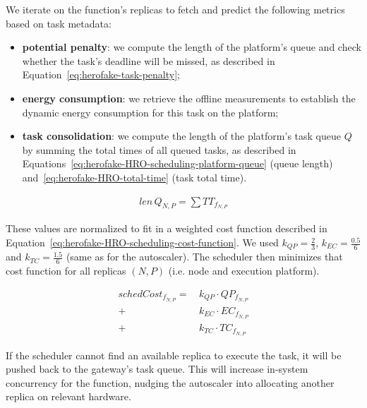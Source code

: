 We iterate on the function's replicas to fetch and predict the following metrics based on task metadata:

\begin{itemize}
    \item \textbf{potential penalty}: we compute the length of the platform's queue and check whether the task's deadline will be missed, as described in Equation~\ref{eq:herofake-task-penalty};
    \item \textbf{energy consumption}: we retrieve the offline measurements to establish the dynamic energy consumption for this task on the platform;
    \item \textbf{task consolidation}: we compute the length of the platform's task queue $Q$ by summing the total times of all queued tasks, as described in Equations~\ref{eq:herofake-HRO-scheduling-platform-queue} (queue length) and~\ref{eq:herofake-HRO-total-time} (task total time). 
\end{itemize}

\begin{equation}
\begin{split}
    len \, Q_{N, P} = \sum TT_{f_{N, P}}
\end{split}
\label{eq:herofake-HRO-scheduling-platform-queue}
\end{equation}

These values are normalized to fit in a weighted cost function described in Equation~\ref{eq:herofake-HRO-scheduling-cost-function}. We used $k_{QP} = \frac{2}{3}$, $k_{EC} = \frac{0.5}{6}$ and $k_{TC} = \frac{1.5}{6}$ (same as for the autoscaler). The scheduler then minimizes that cost function for all replicas $(N, P)$ (i.e. node and execution platform).

\begin{equation}
\begin{split}
    schedCost_{{f}_{N, P}} = \, &k_{QP} \cdot QP_{{f}_{N, P}} \\
    + &k_{EC} \cdot {EC}_{{f}_{N, P}} \\
    + &k_{TC} \cdot TC_{{f}_{N, P}}
\end{split}
\label{eq:herofake-HRO-scheduling-cost-function}
\end{equation}

If the scheduler cannot find an available replica to execute the task, it will be pushed back to the gateway's task queue. This will increase in-system concurrency for the function, nudging the autoscaler into allocating another replica on relevant hardware.

